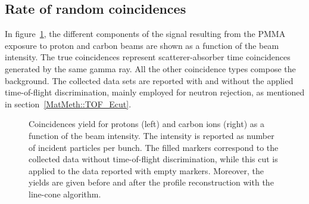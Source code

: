 \subsection{Rate of random coincidences}
\label{Results::beamInt}
 
In figure~\ref{fig:coincidences}, the different components of the signal resulting from the PMMA exposure to proton and carbon beams are shown as a function of the beam intensity. The true coincidences represent scatterer-absorber time coincidences generated by the same gamma ray. All the other coincidence types compose the background. The collected data sets are reported with and without the applied time-of-flight discrimination, mainly employed for neutron rejection, as mentioned in section~\ref{MatMeth::TOF_Ecut}.


\begin{figure} [!h]
  \caption{Coincidences yield for protons (left) and carbon ions (right) as a function of the beam intensity. The intensity is reported as number of incident particles per bunch. The filled markers correspond to the collected data without time-of-flight discrimination, while this cut is applied to the data reported with empty markers. Moreover, the yields are given before and after the profile reconstruction with the line-cone algorithm.}
  \label{fig:coincidences}
\end{figure}

